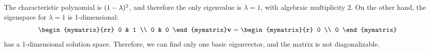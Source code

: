 \begin{solution}
  The characteristic polynomial is $(1-\lambda)^2$, and therefore
  the only eigenvalue is $\lambda=1$, with algebraic multiplicity
  $2$. On the other hand, the eigenspace for $\lambda=1$ is
  1-dimensional:
  \begin{equation*}
    \begin{mymatrix}{rr}
      0 & 1 \\
      0 & 0
    \end{mymatrix}
    \vect{v}
    = \begin{mymatrix}{r} 0 \\ 0 \end{mymatrix}
  \end{equation*}
  has a 1-dimensional solution space. Therefore, we can find only one
  basic eigenvector, and the matrix is not diagonalizable.
\end{solution}
